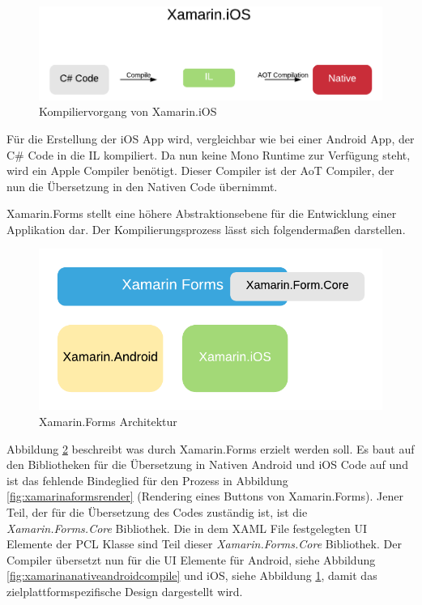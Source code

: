 	\begin{figure}[h!]
		\centering
		\includegraphics[width=1\textwidth]{images/Xamarin-iOS.png}
		\caption{Kompiliervorgang von Xamarin.iOS}
		\label{fig:xamarinanativeioscompile}
	\end{figure}

	Für die Erstellung der iOS App wird, vergleichbar wie bei einer Android App, der C\# Code in die IL kompiliert. Da nun keine Mono Runtime zur Verfügung steht, wird ein Apple Compiler benötigt. Dieser Compiler ist der AoT Compiler, der nun die Übersetzung in den Nativen Code übernimmt.

	Xamarin.Forms stellt eine höhere Abstraktionsebene für die Entwicklung einer Applikation dar. Der Kompilierungsprozess lässt sich folgendermaßen darstellen.

	\begin{figure}[h!]
		\centering
		\includegraphics[width=1\textwidth]{images/Xamarin-Forms.png}
		\caption{Xamarin.Forms Architektur}
		\label{fig:xamarinformsarchitecture}
	\end{figure}

	Abbildung \ref{fig:xamarinformsarchitecture} beschreibt was durch Xamarin.Forms erzielt werden soll. Es baut auf den Bibliotheken für die Übersetzung in Nativen Android und iOS Code auf und ist das fehlende Bindeglied für den Prozess in Abbildung \ref{fig:xamarinaformsrender} (Rendering eines Buttons von Xamarin.Forms). Jener Teil, der für die Übersetzung des Codes zuständig ist, ist die \textit{Xamarin.Forms.Core} Bibliothek. Die in dem XAML File festgelegten UI Elemente der PCL Klasse sind Teil dieser \textit{Xamarin.Forms.Core} Bibliothek. Der Compiler übersetzt nun für die UI Elemente für Android, siehe Abbildung \ref{fig:xamarinanativeandroidcompile} und iOS, siehe Abbildung \ref{fig:xamarinanativeioscompile}, damit das zielplattformspezifische Design dargestellt wird.
	\newpage

